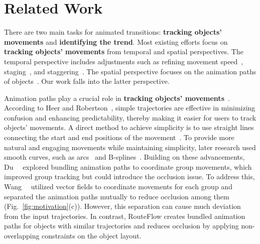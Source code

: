 \section{Related Work}
There are two main tasks for animated transitions: \textbf{tracking objects' movements} and \textbf{identifying the trend}.
Most existing efforts focus on \textbf{tracking objects' movements} from temporal and spatial perspectives.
The temporal perspective includes adjustments such as refining movement speed~\cite{dragicevic2011distortion}, staging~\cite{guilmaine2012hierarchy,heer2007animated,zheng2018focus+}, and staggering~\cite{chevalier2014not}.
The spatial perspective focuses on the animation paths of objects~\cite{du2015trajectory,heer2007animated,wang2017vector,yee2001animated}.
Our work falls into the latter perspective.

Animation paths play a crucial role in \textbf{tracking objects' movements}~\cite{fencsik2007role,mutsumi2006trajectory}.
According to Heer and Robertson~\cite{heer2007animated}, simple trajectories are effective in minimizing confusion and enhancing predictability, thereby making it easier for users to track objects' movements.
A direct method to achieve simplicity is to use straight lines connecting the start and end positions of the movement~\cite{chang1993animation}.
To provide more natural and engaging movements while maintaining simplicity, later research used smooth curves, such as arcs~\cite{dragicevic2011gliimpse,yee2001animated} and B-splines~\cite{cao2011dicon}. 
Building on these advancements, Du~\etal~\cite{du2015trajectory} explored bundling animation paths to coordinate group movements, which improved group tracking
but could introduce the occlusion issue.
To address this, Wang~\etal~\cite{wang2017vector} utilized vector fields to coordinate movements for each group and separated the animation paths mutually to reduce occlusion among them (Fig.~\ref{fig:motivation}(c)).
However, this separation can cause much deviation from the input trajectories.
In contrast, RouteFlow creates bundled animation paths for objects with similar trajectories and reduces occlusion by applying non-overlapping constraints on the object layout.




